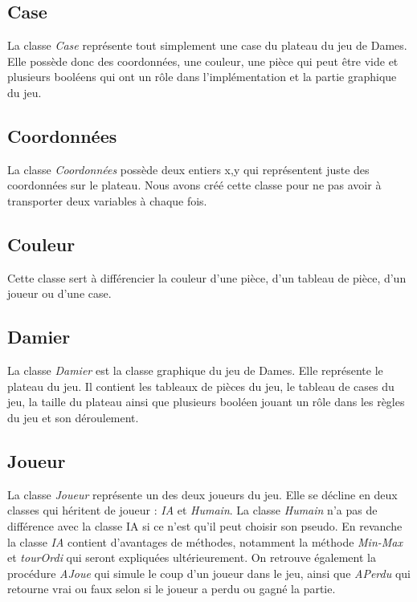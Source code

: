 \documentclass[12,french]{report}
\begin{document}
\subsection{Case}

La classe \textit{Case} représente tout simplement une case du plateau du jeu de Dames. Elle possède donc des coordonnées, une couleur, une pièce qui peut être vide et plusieurs booléens qui ont un rôle dans l'implémentation et la partie graphique du jeu.
  
\subsection{Coordonnées}

La classe \textit{Coordonnées} possède deux entiers x,y qui représentent juste des coordonnées sur le plateau. Nous avons créé cette classe pour ne pas avoir à transporter deux variables à chaque fois.

\subsection{Couleur}

Cette classe sert à différencier la couleur d'une pièce, d'un tableau de pièce, d'un joueur ou d'une case.

\subsection{Damier}

La classe \textit{Damier} est la classe graphique du jeu de Dames. Elle représente le plateau du jeu. Il contient les tableaux de pièces du jeu, le tableau de cases du jeu, la taille du plateau ainsi que plusieurs booléen jouant un rôle dans les règles du jeu et son déroulement.

\subsection{Joueur}

La classe \textit{Joueur} représente un des deux joueurs du jeu. Elle se décline en deux classes qui héritent de joueur : \textit{IA} et \textit{Humain}. La classe \textit{Humain} n'a pas de différence avec la classe IA si ce n'est qu'il peut choisir son pseudo. En revanche la classe \textit{IA} contient d'avantages de méthodes, notamment la méthode \textit{Min-Max} et \textit{tourOrdi} qui seront expliquées ultérieurement. On retrouve également la procédure \textit{AJoue} qui simule le coup d'un joueur dans le jeu, ainsi que \textit{APerdu} qui retourne vrai ou faux selon si le joueur a perdu ou gagné la partie.
\end{document}
